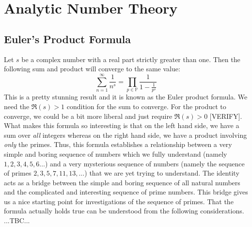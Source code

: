 \section{Analytic Number Theory}


\subsection{Euler's Product Formula}
Let $s$ be a complex number with a real part strictly greater than one. Then the following sum and product will converge to the same value:
\begin{equation}
\sum_{n=1}^{\infty} \frac{1}{n^s} = \prod_{p \in \mathbb{P}} \frac{1}{1 - \frac{1}{p^s}}
\end{equation}
This is a pretty stunning result and it is known as the Euler product formula. We need the $\Re(s) > 1$ condition for the sum to converge. For the product to converge, we could be a bit more liberal and just require $\Re(s) > 0$ [VERIFY]. What makes this formula so interesting is that on the left hand side, we have a sum over \emph{all} integers whereas on the right hand side, we have a product involving \emph{only} the primes. Thus, this formula establishes a relationship between a very simple and boring sequence of numbers which we fully understand (namely $1,2,3,4,5,6\ldots$) and a very mysterious sequence of numbers (namely the sequence of primes $2,3,5,7,11,13,\ldots$) that we are yet trying to understand. The identity acts as a bridge between the simple and boring sequence of all natural numbers and the complicated and interesting sequence of prime numbers. This bridge gives us a nice starting point for investigations of the sequence of primes. That the formula actually holds true can be understood from the following considerations. ...TBC...





